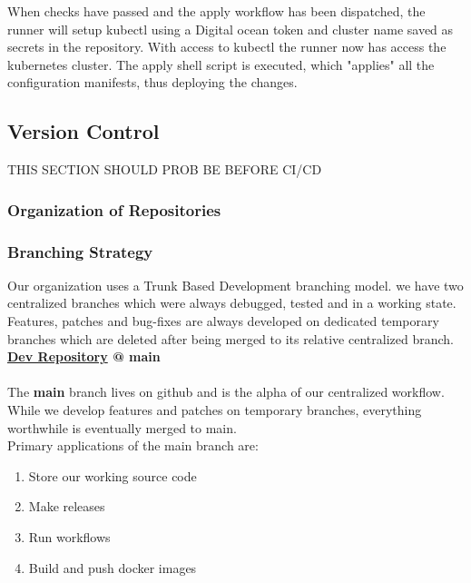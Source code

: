 When checks have passed and the apply workflow has been dispatched, the runner will setup kubectl using a Digital ocean token and cluster name saved as secrets in the repository. With access to kubectl the runner now has access the kubernetes cluster. The apply shell script is executed, which "applies" all the configuration manifests, thus deploying the changes.


\subsection{Version Control}
\label{subsec:vs}
THIS SECTION SHOULD PROB BE BEFORE CI/CD 
\subsubsection{Organization of Repositories}
\subsubsection{Branching Strategy}

Our organization uses a Trunk Based Development branching model. we have two centralized branches which were always debugged, tested and in a working state. Features, patches and bug-fixes are always developed on dedicated temporary branches which are deleted after being merged to its relative centralized branch. \\

\textbf{\hyperref[app:devRepo]{Dev Repository} @ main} \\\\
The \textbf{main} branch lives on github and is the alpha of our centralized workflow. While we develop features and patches on temporary branches, everything worthwhile is eventually merged to main. \\

Primary applications of the main branch are:
\begin{enumerate}
    \item Store our working source code
    \item Make releases
    \item Run workflows
    \item Build and push docker images\\
\end{enumerate}

